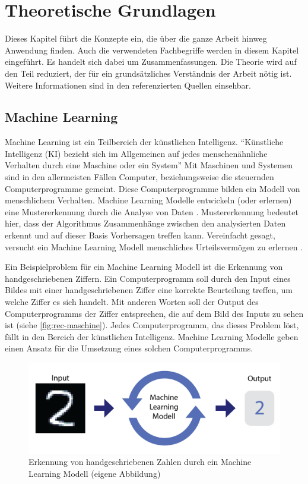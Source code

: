 \chapter{Theoretische Grundlagen}\label{chap:t}
Dieses Kapitel führt die Konzepte ein, die über die ganze Arbeit hinweg
Anwendung finden. Auch die verwendeten Fachbegriffe werden in diesem Kapitel
eingeführt. Es handelt sich dabei um Zusammenfassungen. Die Theorie wird auf den
Teil reduziert, der für ein grundsätzliches Verständnis der Arbeit nötig ist.
Weitere Informationen sind in den referenzierten Quellen einsehbar.
 
\section{Machine Learning}\label{chap:t_ml}
Machine Learning ist ein Teilbereich der künstlichen Intelligenz. ``Künstliche
Intelligenz (KI) bezieht sich im Allgemeinen auf jedes menschenähnliche
Verhalten durch eine Maschine oder ein System'' \cite{noauthor_what_nodate} Mit
Maschinen und Systemen sind in den allermeisten Fällen Computer, beziehungsweise
die steuernden Computerprogramme gemeint. Diese Computerprogramme bilden ein
Modell von menschlichem Verhalten. Machine Learning Modelle entwickeln (oder
erlernen) eine Mustererkennung durch die Analyse von Daten
\cite{noauthor_what_nodate-1}. Mustererkennung bedeutet hier, dass der
Algorithmus Zusammenhänge zwischen den analysierten Daten erkennt und auf dieser
Basis Vorhersagen treffen kann. Vereinfacht gesagt, versucht ein Machine
Learning Modell menschliches Urteilsvermögen zu erlernen
\cite{spaulding_is_2020}.
 
Ein Beispielproblem für ein Machine Learning Modell ist die Erkennung von
handgeschriebenen Ziffern. Ein Computerprogramm soll durch den Input eines
Bildes mit einer handgeschriebenen Ziffer eine korrekte Beurteilung treffen, um
welche Ziffer es sich handelt. Mit anderen Worten soll der Output des
Computerprogramms der Ziffer entsprechen, die auf dem Bild des Inputs zu sehen
ist (siehe \autoref{fig:rec-maschine}). Jedes Computerprogramm, das dieses
Problem löst, fällt in den Bereich der künstlichen Intelligenz. Machine Learning
Modelle geben einen Ansatz für die Umsetzung eines solchen Computerprogramms.
 
\begin{figure}[!ht]
   \centering
   \includegraphics[width=\textwidth]{images/theorie/rec-maschine.png}
   \caption{Erkennung von handgeschriebenen Zahlen durch ein Machine Learning Modell (eigene Abbildung)}\label{fig:rec-maschine}
\end{figure}
 
